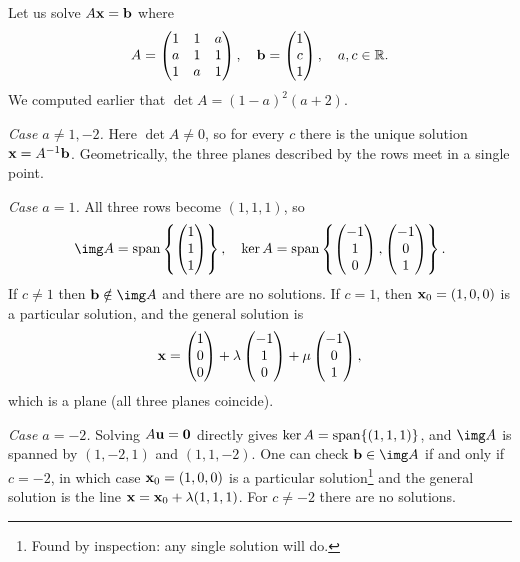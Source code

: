 \documentclass[a4paper]{scrartcl}
\begin{document}
\begin{example}
	Let us solve $A \mathbf{x} = \mathbf{b}$ where
	$$
	A = \begin{pmatrix}
		1 & 1 & a \\ a & 1 & 1 \\ 1 & a & 1
	\end{pmatrix}, \quad
	\mathbf{b} = \begin{pmatrix}
		1 \\ c \\ 1
	\end{pmatrix}, \quad a, c \in \mathbb{R}.
	$$
	We computed earlier that $\det A = (1 - a)^2(a + 2)$.

	\emph{Case $a \neq 1, -2$.} Here $\det A \neq 0$, so for every $c$ there is the unique solution $\mathbf{x} = A^{-1}\mathbf{b}$. Geometrically, the three planes described by the rows meet in a single point.

	\emph{Case $a = 1$.} All three rows become $(1, 1, 1)$, so
	$$
	\img A = \vecspan\left\{\begin{pmatrix} 1 \\ 1\\ 1\end{pmatrix}\right\}, \quad
	\ker A = \vecspan\left\{\begin{pmatrix} -1 \\ 1\\ 0\end{pmatrix}, \begin{pmatrix} -1 \\ 0\\ 1\end{pmatrix}\right\}.
	$$
	If $c \neq 1$ then $\vv{b} \notin \img A$ and there are no solutions. If $c = 1$, then $\mathbf{x}_0 = (1, 0, 0)$ is a particular solution, and the general solution is
	$$
	\mathbf{x} = \begin{pmatrix} 1 \\ 0 \\ 0\end{pmatrix} + \lambda \begin{pmatrix} -1 \\ 1 \\ 0\end{pmatrix} + \mu \begin{pmatrix} -1 \\ 0 \\ 1\end{pmatrix},
	$$
	which is a plane (all three planes coincide).

	\emph{Case $a = -2$.} Solving $A \mathbf{u} = \mathbf{0}$ directly gives $\ker A = \operatorname{span}\{(1,1,1)\}$, and $\img A$ is spanned by $(1, -2, 1)$ and $(1, 1, -2)$. One can check $\vv{b} \in \img A$ if and only if $c = -2$, in which case $\mathbf{x}_0 = (1, 0, 0)$ is a particular solution\footnote{Found by inspection: any single solution will do.} and the general solution is the line $\mathbf{x} = \mathbf{x}_0 + \lambda(1,1,1)$. For $c \neq -2$ there are no solutions.
\end{example}
\end{document}

